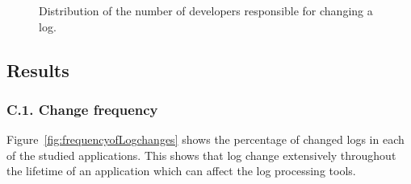 \begin{figure}[tb]
	
	\centering
	\caption{Distribution of the number of developers responsible
		for changing a log.}
	\label{fig:NumberofDevelopers}
\end{figure}





\subsection{Results}

\subsubsection*{C.1. Change frequency}
Figure~\ref{fig:frequencyofLogchanges} shows the percentage of changed logs in each of the studied applications. This shows that log change extensively throughout the lifetime of an application which can affect the log processing tools.
 





